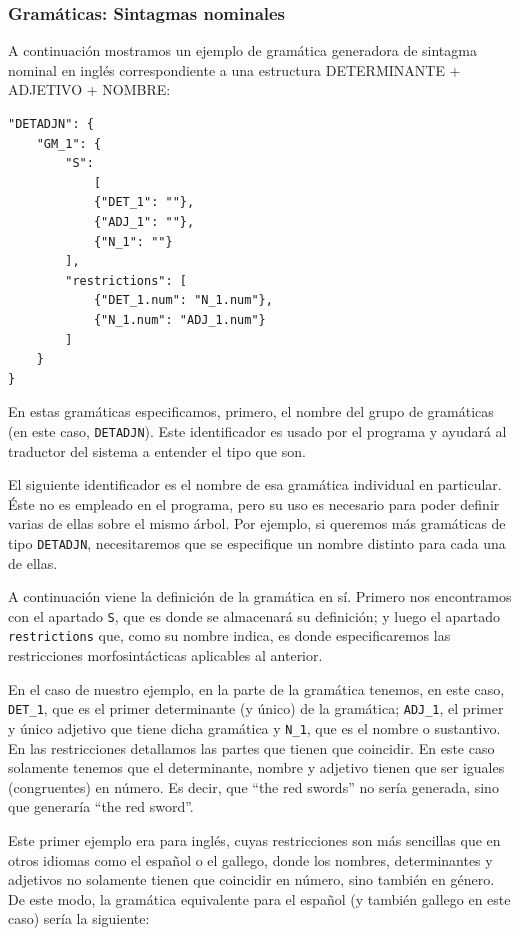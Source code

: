 \subsubsection{Gramáticas: Sintagmas nominales}

A continuación mostramos un ejemplo de gramática generadora de sintagma nominal en inglés correspondiente a una estructura DETERMINANTE + ADJETIVO + NOMBRE:

\begin{lstlisting}[style=json]
"DETADJN": {
    "GM_1": {
        "S": 
            [
            {"DET_1": ""}, 
            {"ADJ_1": ""}, 
            {"N_1": ""}
        ],
        "restrictions": [
            {"DET_1.num": "N_1.num"},
            {"N_1.num": "ADJ_1.num"}
        ]
    }
}
\end{lstlisting}

\noindent En estas gramáticas especificamos, primero, el nombre del grupo de gramáticas (en este caso, \texttt{DETADJN}). Este identificador es usado por el programa y ayudará al traductor del sistema a entender el tipo que son.

El siguiente identificador es el nombre de esa gramática individual en particular. Éste no es empleado en el programa, pero su uso es necesario para poder definir varias de ellas sobre el mismo árbol. Por ejemplo, si queremos más gramáticas de tipo \texttt{DETADJN}, necesitaremos que se especifique un nombre distinto para cada una de ellas.

A continuación viene la definición de la gramática en sí. Primero nos encontramos con el apartado \texttt{S}, que es donde se almacenará su definición; y luego el apartado \texttt{restrictions} que, como su nombre indica, es donde especificaremos las restricciones morfosintácticas aplicables al anterior.

En el caso de nuestro ejemplo, en la parte de la gramática tenemos, en este caso, \texttt{DET\_1}, que es el primer determinante (y único) de la gramática; \texttt{ADJ\_1}, el primer y único adjetivo que tiene dicha gramática y \texttt{N\_1}, que es el nombre o sustantivo.
En las restricciones detallamos las partes que tienen que coincidir. En este caso solamente tenemos que el determinante, nombre y adjetivo tienen que ser iguales (congruentes) en número. Es decir, que ``the red swords'' no sería generada, sino que generaría ``the red sword''.

Este primer ejemplo era para inglés, cuyas restricciones son más sencillas que en otros idiomas como el español o el gallego, donde los nombres, determinantes y adjetivos no solamente tienen que coincidir en número, sino también en género. De este modo, la gramática equivalente para el español (y también gallego en este caso) sería la siguiente:

